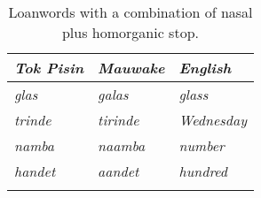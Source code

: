 \begin{table} 
 \caption{Loanwords with a combination of nasal plus homorganic stop.}
\label{tab:2:loanwords}
\begin{tabular}{>{\itshape}l>{\itshape}l>{\itshape}l}
\mytoprule
\upshape Tok Pisin   & \upshape Mauwake  & \upshape English\\
\midrule 
glas & galas&  glass \\
{trinde}&  tirinde &  Wednesday \\
{namba} & naamba & number \\
{handet} & aandet & hundred \\
\mybottomrule
\end{tabular}

\end{table}


\renewcommand{\exfont}{\itshape}
\renewcommand{\eachwordone}{\itshape}